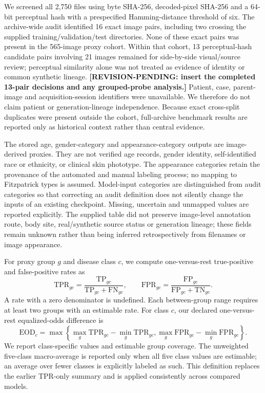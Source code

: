 We screened all 2,750 files using byte SHA-256, decoded-pixel SHA-256 and a
64-bit perceptual hash with a prespecified Hamming-distance threshold of six.
The archive-wide audit identified 16 exact image pairs, including two crossing
the supplied training/validation/test directories. None of these exact pairs
was present in the 565-image proxy cohort. Within that cohort, 13 perceptual-hash
candidate pairs involving 21 images remained for side-by-side visual/source
review; perceptual similarity alone was not treated as evidence of identity or
common synthetic lineage. \textbf{[REVISION-PENDING: insert the completed
13-pair decisions and any grouped-probe analysis.] } Patient, case, parent-image
and acquisition-session identifiers were unavailable. We therefore do not
claim patient or generation-lineage independence. Because exact cross-split
duplicates were present outside the cohort, full-archive benchmark results are
reported only as historical context rather than central evidence.

The stored age, gender-category and appearance-category outputs are
image-derived proxies. They are not verified age records, gender identity,
self-identified race or ethnicity, or clinical skin phototype. The appearance
categories retain the provenance of the automated and manual labeling process;
no mapping to Fitzpatrick types is assumed. Model-input categories are
distinguished from audit categories so that correcting an audit definition does
not silently change the inputs of an existing checkpoint. Missing, uncertain
and unmapped values are reported explicitly.
The supplied table did not preserve image-level annotation route, body site,
real/synthetic source status or generation lineage; these fields remain
unknown rather than being inferred retrospectively from filenames or image
appearance.

For proxy group $g$ and disease class $c$, we compute one-versus-rest
true-positive and false-positive rates as
\begin{equation}
\mathrm{TPR}_{gc}=\frac{\mathrm{TP}_{gc}}{\mathrm{TP}_{gc}+\mathrm{FN}_{gc}},
\qquad
\mathrm{FPR}_{gc}=\frac{\mathrm{FP}_{gc}}{\mathrm{FP}_{gc}+\mathrm{TN}_{gc}}.
\end{equation}
A rate with a zero denominator is undefined. Each between-group range requires
at least two groups with an estimable rate. For class $c$, our declared
one-versus-rest equalized-odds difference is
\begin{equation}
\mathrm{EOD}_{c}=\max\left\{
\max_g\mathrm{TPR}_{gc}-\min_g\mathrm{TPR}_{gc},
\max_g\mathrm{FPR}_{gc}-\min_g\mathrm{FPR}_{gc}\right\}.
\end{equation}
We report class-specific values and estimable group coverage. The unweighted
five-class macro-average is reported only when all five class values are
estimable; an average over fewer classes is explicitly labeled as such. This
definition replaces the earlier TPR-only summary and is applied consistently
across compared models.

